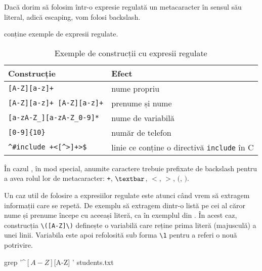 Dacă dorim să folosim într-o expresie regulată un metacaracter în sensul său literal, adică escaping, vom folosi backslash.

 conține exemple de expresii regulate.

\begin{table}[!htb]
  \caption{Exemple de construcții cu expresii regulate}
  \begin{center}
    \begin{tabular}{ p{} p{} }
      \toprule
        \textbf{Construcție} &
        \textbf{Efect} \\
      \midrule
        \verb|[A-Z][a-z]+| &
        nume propriu \\

        \verb|[A-Z][a-z]+ [A-Z][a-z]+| &
        prenume și nume \\

        \verb|[a-zA-Z_][a-zA-Z_0-9]*| &
        nume de variabilă \\

        \verb|[0-9]{10}| &
        număr de telefon \\

        \verb|^#include +<[^>]+>$| &
        linie ce conține o directivă \texttt{include} în C \\

      \bottomrule
    \end{tabular}
    \label{tab:cli:regex-example}
  \end{center}
\end{table}

În cazul , în mod special, anumite caractere trebuie prefixate de backslash
pentru a avea rolul lor de metacaracter: \texttt{+}, \texttt{$\textbar$}, \texttt{$<$}, \texttt{$>$}, \texttt{$($}, \texttt{$)$}.

Un caz util de folosire a expresiilor regulate este atunci când vrem să extragem
informații care se repetă. De exemplu să extragem dintr-o listă pe cei al căror
nume și prenume începe cu aceeași literă, ca în exemplul din . În acest caz, construcția \verb|\([A-Z]\)| definește o variabilă care reține prima literă (majusculă) a unei linii. Variabila este apoi refolosită sub forma \verb|\1| pentru a referi o nouă potrivire.

\begin{screen}[caption={Expresii regulate cu variabile},escapechar=,label={lst:cli:regex-var}]
grep '^\([A-Z]\)[A-Z]\+ \1' students.txt
\end{screen}

